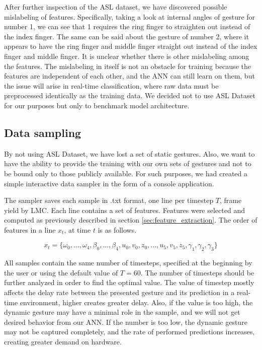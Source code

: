 After further inspection of the ASL dataset, we have discovered possible mislabeling of features. Specifically, taking a look at internal angles of gesture for number 1, we can see that 1 requires the ring finger to straighten out instead of the index finger. The same can be said about the gesture of number 2, where it appears to have the ring finger and middle finger straight out instead of the index finger and middle finger. It is unclear whether there is other mislabeling among the features. The mislabeling in itself is not an obstacle for training because the features are independent of each other, and the ANN can still learn on them, but the issue will arise in real-time classification, where raw data must be preprocessed identically as the training data. We decided not to use ASL Dataset for our purposes but only to benchmark model architecture.


\subsection{Data sampling}
\label{data_sampling}
By not using ASL Dataset, we have lost a set of static gestures. Also, we want to have the ability to provide the training with our own sets of gestures and not to be bound only to those publicly available. For such purposes, we had created a simple interactive data sampler in the form of a console application.

The sampler saves each sample in .txt format, one line per timestep $T$, frame yield by LMC. Each line contains a set of features. Features were selected and computed as previously described in section \ref{sec:feature_extraction}. The order of features in a line $x_t$, at time $t$ is as follows.


\begin{equation}
    {x_t = \{\omega_0, ...,\omega_4, \beta_0, ..., \beta_4, u_0,v_0,z_0, ..., u_5,v_5,z_5, \gamma_1, \gamma_2, \gamma_3\}}
\end{equation}

All samples contain the same number of timesteps, specified at the beginning by the user or using the default value of $T=60$. The number of timesteps should be further analyzed in order to find the optimal value. The value of timestep mostly affects the delay rate between the presented gesture and its prediction in a real-time environment, higher creates greater delay. Also, if the value is too high, the dynamic gesture may have a minimal role in the sample, and we will not get desired behavior from our ANN. If the number is too low, the dynamic gesture may not be captured completely, and the rate of performed predictions increases, creating greater demand on hardware. 

